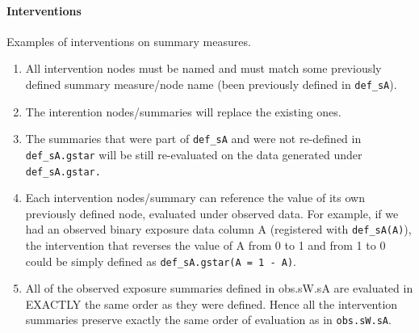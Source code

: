 \documentclass[english]{article}\usepackage[]{graphicx}\usepackage[]{color}
\theoremstyle{plain}
\theoremstyle{plain}
\begin{document}
\paragraph{Interventions}

Examples of interventions on summary measures.

\begin{enumerate}
\item{All intervention nodes must be named and must match some previously defined summary measure/node name (been previously defined in  \texttt{def\_sA}).}
\item{The interention nodes/summaries will replace the existing ones.}
\item{The summaries that were part of  \texttt{def\_sA} and were not re-defined in  \texttt{def\_sA.gstar} will be  still re-evaluated on the data generated under  \texttt{def\_sA.gstar.}}
\item{Each intervention nodes/summary can reference the value of its own previously defined node, evaluated under observed data. For example, if we had an observed binary exposure data column A (registered with \texttt{def\_sA(A)}), the intervention that reverses the value of A from 0 to 1 and from 1 to 0 could be simply defined as \texttt{def\_sA.gstar(A = 1 - A)}.}
\item{All of the observed exposure summaries defined in obs.sW.sA are evaluated in EXACTLY the same order as they were defined. Hence all the intervention summaries preserve exactly the same order of evaluation as in \texttt{obs.sW.sA}.}
\end{enumerate}
\end{document}
